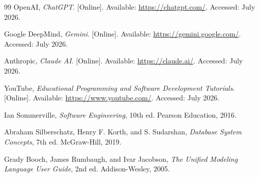 \begin{thebibliography}{99}
OpenAI, \emph{ChatGPT}. [Online]. Available: \url{https://chatgpt.com/}. Accessed: July 2026.

Google DeepMind, \emph{Gemini}. [Online]. Available: \url{https://gemini.google.com/}. Accessed: July 2026.

Anthropic, \emph{Claude AI}. [Online]. Available: \url{https://claude.ai/}. Accessed: July 2026.

YouTube, \emph{Educational Programming and Software Development Tutorials}. [Online]. Available: \url{https://www.youtube.com/}. Accessed: July 2026.

Ian Sommerville, \emph{Software Engineering}, 10th ed. Pearson Education, 2016.

Abraham Silberschatz, Henry F. Korth, and S. Sudarshan, \emph{Database System Concepts}, 7th ed. McGraw-Hill, 2019.

Grady Booch, James Rumbaugh, and Ivar Jacobson, \emph{The Unified Modeling Language User Guide}, 2nd ed. Addison-Wesley, 2005.

\end{thebibliography}